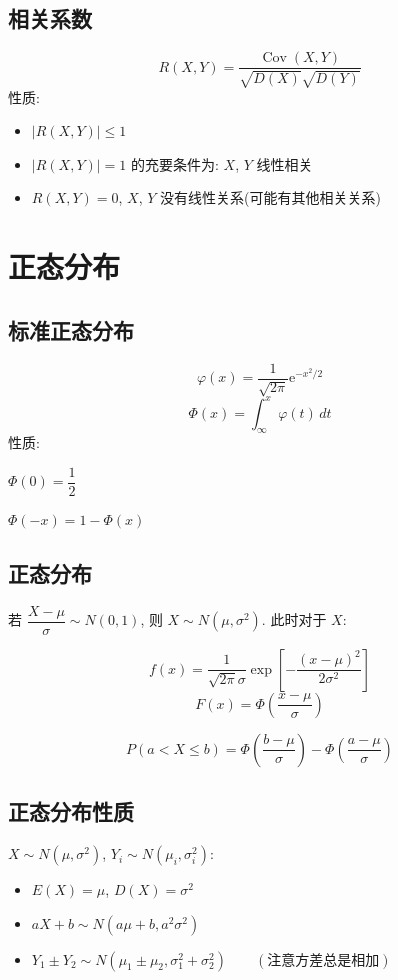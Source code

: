 \documentclass[UTF8]{ctexart}
\newcommand{\E}{\mathrm e}
\DeclareMathOperator{\Cov}{Cov}
\begin{document}
\subsection{相关系数}
\[ R(X, Y) = \dfrac{\Cov(X, Y)}{\sqrt{D(X)} \sqrt{D(Y)}} \]
性质:
\begin{itemize}
    \item $ |R(X, Y)| \leqslant 1 $
    \item $ |R(X, Y)| = 1 $ 的充要条件为: $ X $, $ Y $ 线性相关
    \item $ R(X, Y) = 0 $, $ X $, $ Y $ 没有线性关系(可能有其他相关关系)
\end{itemize}


\section{正态分布}
\subsection{标准正态分布}
\[ \varphi(x) = \dfrac{1}{\sqrt{2\pi}} \E^{-x^2 / 2} \]
\[ \Phi(x) = \int_{\infty}^{x} \varphi(t) \,dt \]
性质:

$ \Phi(0) = \dfrac{1}{2} $

$ \Phi(-x) = 1 - \Phi(x) $

\subsection{正态分布}
若 $ \dfrac{X - \mu}{\sigma} \sim N(0, 1) $, 则 $ X \sim N(\mu, \sigma^2) $. 此时对于 $ X $:

\[ f(x) = \dfrac{1}{\sqrt{2\pi} \sigma} \exp\left[ -\dfrac{(x - \mu)^2}{2\sigma^2} \right] \]
\[ F(x) = \Phi\left( \dfrac{x - \mu}{\sigma} \right) \]

\[ P(a < X \leqslant b) = \Phi\left( \dfrac{b - \mu}{\sigma} \right) - \Phi\left( \dfrac{a - \mu}{\sigma} \right) \]

\subsection{正态分布性质}
$ X \sim N(\mu, \sigma^2) $, $ Y_i \sim N(\mu_i, \sigma_i^2) $:
\begin{itemize}
    \item $ E(X) = \mu $, $ D(X) = \sigma^2 $
    \item $ a X + b \sim N(a \mu + b, a^2 \sigma^2) $
    \item $ Y_1 \pm Y_2 \sim N(\mu_1 \pm \mu_2, \sigma_1^2 + \sigma_2^2) \qquad (\text{注意方差总是相加}) $ 
\end{itemize}
\end{document}
